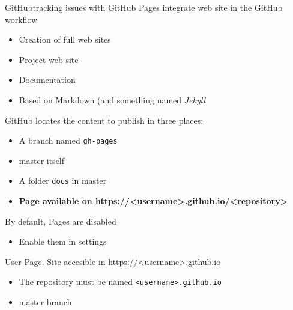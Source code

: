 \documentclass[10pt,compress]{beamer} %
\begin{document}
\begin{frame}{GitHub}{tracking issues with GitHub}
	Pages integrate web site in the GitHub workflow
	\begin{itemize}
		\item Creation of full web sites
		\item Project web site
		\item Documentation
		\item Based on Markdown (and something named \textit{Jekyll}
	\end{itemize}

	GitHub locates the content to publish in three places:
	\begin{itemize}
		\item A branch named \texttt{gh-pages}
		\item master itself
		\item A folder \texttt{docs} in master
		\item \textbf{Page available on \url{https://<username>.github.io/<repository>}}
	\end{itemize}

	By default, Pages are disabled 
	\begin{itemize}
		\item Enable them in settings
	\end{itemize}

	User Page. Site accesible in \url{https://<username>.github.io}
	\begin{itemize}
		\item The repository must be named \texttt{<username>.github.io}
		\item master branch
	\end{itemize}
\end{frame}



% 
% 


\end{document}

